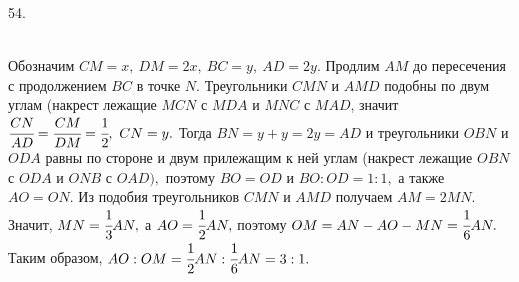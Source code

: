 54. \begin{figure}[ht!]
\end{figure}\\
Обозначим $CM=x,\ DM=2x,\ BC=y,\ AD=2y.$ Продлим $AM$ до пересечения с продолжением $BC$ в точке $N.$ Треугольники $CMN$ и $AMD$ подобны по двум углам (накрест лежащие  $MCN$ с $MDA$ и $MNC$ с $MAD$, значит $\cfrac{CN}{AD}=\cfrac{CM}{DM}=\cfrac{1}{2},\ CN=y.$ Тогда $BN=y+y=2y=AD$ и треугольники $OBN$ и $ODA$ равны по стороне и двум прилежащим к ней углам (накрест лежащие $OBN$ с $ODA$ и $ONB$ с $OAD),$ поэтому $BO=OD$ и $BO:OD=1:1,$ а также $AO=ON.$ Из подобия треугольников $CMN$ и $AMD$ получаем $AM=2MN.$ Значит, $MN=\cfrac{1}{3}AN,$ а $AO=\cfrac{1}{2}AN,$ поэтому $OM=AN-AO-MN=\cfrac{1}{6}AN.$ Таким образом, $AO:OM=\cfrac{1}{2}AN:\cfrac{1}{6}AN=3:1.$\\

